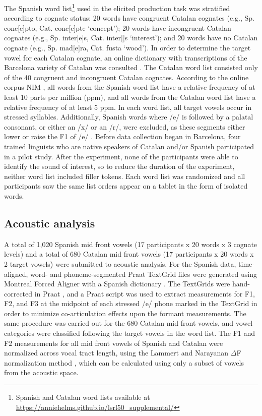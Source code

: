 \documentclass[output=paper,colorlinks,citecolor=brown,draftmode]{langscibook}
\begin{document}
	The Spanish word list\footnote{Spanish and Catalan word lists available at \url{https://anniehelms.github.io/lsrl50_supplemental/}} used in the elicited production task was stratified according to cognate status: 20 words have congruent Catalan cognates (e.g., Sp. conc[e]pto, Cat. conc[e]pte `concept'); 20 words have incongruent Catalan cognates (e.g., Sp. inter[e]s, Cat. inter[\textepsilon]s `interest'); and 20 words have no Catalan cognate (e.g., Sp. mad[e]ra, Cat. fusta `wood'). In order to determine the target vowel for each Catalan cognate, an online dictionary with transcriptions of the Barcelona variety of Catalan was consulted \citep{alcover2002diccionari}. The Catalan word list consisted only of the 40 congruent and incongruent Catalan cognates. According to the online corpus NIM \citep{guasch2013nim}, all words from the Spanish word list have a relative frequency of at least 10 parts per million (ppm), and all words from the Catalan word list have a relative frequency of at least 5 ppm. In each word list, all target vowels occur in stressed syllables. Additionally, Spanish words where /e/ is followed by a palatal consonant, or either an /x/ or an /r/, were excluded, as these segments either lower or raise the F1 of /e/ \citep[][115]{hualde2013sonidos}.
	Before data collection began in Barcelona, four trained linguists who are native speakers of Catalan and/or Spanish participated in a pilot study. After the experiment, none of the participants were able to identify the sound of interest, so to reduce the duration of the experiment, neither word list included filler tokens. Each word list was randomized and all participants saw the same list orders appear on a tablet in the form of isolated words.

\subsection{Acoustic analysis}
\largerpage
    A total of 1,020 Spanish mid front vowels (17 participants x 20 words x 3 cognate levels) and a total of 680 Catalan mid front vowels (17 participants x 20 words x 2 target vowels) were submitted to acoustic analysis. For the Spanish data, time-aligned, word- and phoneme-segmented Praat TextGrid files were generated using Montreal Forced Aligner \citep{mcauliffe2017montreal} with a Spanish dictionary \citep{morgan2017dict}. The TextGrids were hand-corrected in Praat \citep{boersma6praat}, and a Praat script \citep{riebold2013vowel} was used to extract measurements for F1, F2, and F3 at the midpoint of each stressed /e/ phone marked in the TextGrid in order to minimize co-articulation effects upon the formant measurements. The same procedure was carried out for the 680 Catalan mid front vowels, and vowel categories were classified following the target vowels in the word list. The F1 and F2 measurements for all mid front vowels of Spanish and Catalan were normalized across vocal tract length, using the Lammert and Narayanan $\Delta$F normalization method \citep{johnson2020deltaf}, which can be calculated using only a subset of vowels from the acoustic space.
\end{document}
